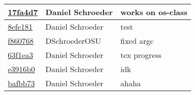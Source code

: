 \begin{tabular}{l l l}
\href{https://github.com/DSchroederOSU/CS444-Group_11_05/commit/17fa4d7daa607f5a8466d4c854083fe763728c40}{17fa4d7} & Daniel Schroeder & works on os-class\\\hline
\href{https://github.com/DSchroederOSU/CS444-Group_11_05/commit/8efe18126d63f4c3156da70cb6e8d6f3bb95dcf6}{8efe181} & Daniel Schroeder & test\\\hline
\href{https://github.com/DSchroederOSU/CS444-Group_11_05/commit/f86076889a02b98fd55cc73c537e49ce93315ea4}{f860768} & DSchroederOSU & fixed argc\\\hline
\href{https://github.com/DSchroederOSU/CS444-Group_11_05/commit/63f1ea3079fb2044a5fd16f4f60ed0afcecbca13}{63f1ea3} & Daniel Schroeder & tex progress\\\hline
\href{https://github.com/DSchroederOSU/CS444-Group_11_05/commit/e3916b0f556dc4093d8689662850a7ac1a0a3e71}{e3916b0} & Daniel Schroeder & idk\\\hline
\href{https://github.com/DSchroederOSU/CS444-Group_11_05/commit/bafbb7390e8525a17d2ad32ccd003c800ed0b4f0}{bafbb73} & Daniel Schroeder & ahaha\\\hline\end{tabular}
